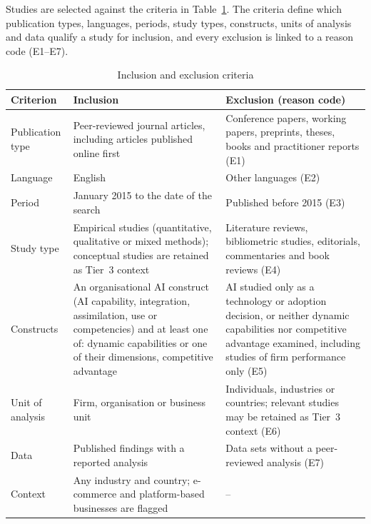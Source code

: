 Studies are selected against the criteria in Table~\ref{tab:criteria}. The criteria define which publication types, languages, periods, study types, constructs, units of analysis and data qualify a study for inclusion, and every exclusion is linked to a reason code (E1--E7).

\begin{table}[htbp]
\centering
\caption{Inclusion and exclusion criteria}
\label{tab:criteria}
\footnotesize
\renewcommand{\arraystretch}{1.1}\setlength{\tabcolsep}{4pt}
\begin{tabularx}{\textwidth}{|>{\raggedright\arraybackslash}p{2.2cm}|>{\raggedright\arraybackslash}X|>{\raggedright\arraybackslash}X|}
\hline
\textbf{Criterion} & \textbf{Inclusion} & \textbf{Exclusion (reason code)} \\
\hline
Publication type & Peer-reviewed journal articles, including articles published online first & Conference papers, working papers, preprints, theses, books and practitioner reports (E1) \\ \hline
Language & English & Other languages (E2) \\ \hline
Period & January 2015 to the date of the search & Published before 2015 (E3) \\ \hline
Study type & Empirical studies (quantitative, qualitative or mixed methods); conceptual studies are retained as Tier~3 context & Literature reviews, bibliometric studies, editorials, commentaries and book reviews (E4) \\ \hline
Constructs & An organisational AI construct (AI capability, integration, assimilation, use or competencies) and at least one of: dynamic capabilities or one of their dimensions, competitive advantage & AI studied only as a technology or adoption decision, or neither dynamic capabilities nor competitive advantage examined, including studies of firm performance only (E5) \\ \hline
Unit of analysis & Firm, organisation or business unit & Individuals, industries or countries; relevant studies may be retained as Tier~3 context (E6) \\ \hline
Data & Published findings with a reported analysis & Data sets without a peer-reviewed analysis (E7) \\ \hline
Context & Any industry and country; e-commerce and platform-based businesses are flagged & -- \\
\hline
\end{tabularx}
\end{table}


